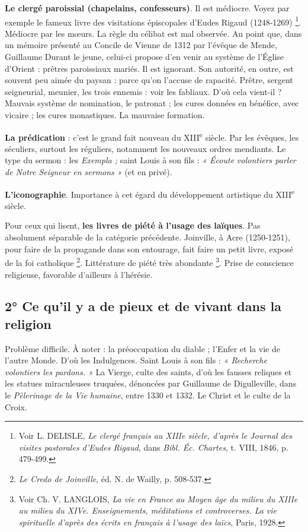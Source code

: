 \documentclass[french,twoside]{book} %
\begin{document}
\begin{listalpha}[itemsep=0pt,]
\item {\bfseries Le clergé paroissial (chapelains, confesseurs)}. Il est médiocre. Voyez par exemple le fameux livre des visitations épiscopales d’Eudes Rigaud (1248-1269) \footnote{ Voir L. DELISLE, {\itshape Le clergé français au XIIIe siècle, d’après le Journal des visites pastorales d’Eudes Rigaud}, dans {\itshape Bibl. Éc. Chartes}, t. VIII, 1846, p. 479-499.}. Médiocre par les mœurs. La règle du célibat est mal observée. Au point que, dans un mémoire présenté au Concile de Vienne de 1312 par l’évêque de Mende, Guillaume Durant le jeune, celui-ci propose d’en venir au système de l’Église d’Orient : prêtres paroissiaux mariés. Il est ignorant. Son autorité, en outre, est souvent peu aimée du paysan : parce qu’on l’accuse de rapacité. Prêtre, sergent seigneurial, meunier, les trois ennemis : voir les fabliaux. D’où cela vient-il ? Mauvais système de nomination, le patronat ; les cures données en bénéfice, avec vicaire ; les cures monastiques. La mauvaise formation.
\item {\bfseries La prédication} : c’est le grand fait nouveau du XIII\textsuperscript{e} siècle. Par les évêques, les séculiers, surtout les réguliers, notamment les nouveaux ordres mendiants. Le type du sermon : les {\itshape Exempla ;} saint Louis à son fils : \emph{« Écoute volontiers parler de Notre Seigneur en sermons »} (et en privé).
\item {\bfseries L’iconographie}. Importance à cet égard du développement artistique du XIII\textsuperscript{e} siècle.
\item Pour ceux qui lisent, {\bfseries les livres de piété à l’usage des laïques}. Pas absolument séparable de la catégorie précédente. Joinville, à Acre (1250-1251), pour faire de la propagande dans son entourage, fait faire un petit livre, exposé de la foi catholique \footnote{{\itshape Le Credo de Joinville}, éd. N. de Wailly, p. 508-537.}. Littérature de piété très abondante \footnote{ Voir Ch. V. LANGLOIS, {\itshape La vie en France au Moyen âge du milieu du XIIIe au milieu du XIVe. Enseignements, méditations et controverses. La vie spirituelle d’après des écrits en français à l’usage des laïcs}, Paris, 1928.}. Prise de conscience religieuse, favorable d’ailleurs à l’hérésie.

\end{listalpha}\subsection[2° Ce qu’il y a de pieux et de vivant dans la religion]{2° Ce qu’il y a de pieux et de vivant dans la religion}
\noindent Problème difficile. À noter : la préoccupation du diable ; l’Enfer et la vie de l’autre Monde. D’où les Indulgences. Saint Louis à son fils : \emph{« Recherche volontiers les pardons. »} La Vierge, culte des saints, d’où les fausses reliques et les statues miraculeuses truquées, dénoncées par Guillaume de Digulleville, dans le {\itshape Pèlerinage de la Vie humaine}, entre 1330 et 1332. Le Christ et le culte de la Croix.
\end{document}
